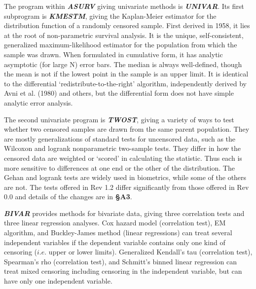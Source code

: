      The program within {\sl\bf ASURV} giving univariate methods is 
{\sl\bf UNIVAR}.  Its first subprogram is {\sl\bf KMESTM}, giving the 
Kaplan-Meier estimator for the distribution function of a randomly 
censored sample.  First derived in 
1958, it lies at the root of non-parametric survival analysis.  It is the
unique, self-consistent, generalized maximum-likelihood estimator for the
population from which the sample was drawn. When formulated in cumulative 
form, it has analytic asymptotic (for large N) error bars. The median is
always well-defined, though the mean is not if the lowest point in the 
sample is an upper limit.  It is identical to the differential 
`redistribute-to-the-right' algorithm, independently derived by Avni et al.
(1980) and others, but the differential form does not have simple analytic 
error analysis.  

     The second univariate program is {\sl\bf TWOST}, giving a variety 
of ways to test whether two censored samples are drawn from the same parent
population.  They are mostly generalizations of standard tests for
uncensored data, such as the Wilcoxon and logrank nonparametric two-sample
tests.  They differ in how the censored data are weighted or `scored' in
calculating the statistic.  Thus each is more sensitive to differences at
one end or the other of the distribution.  The Gehan and logrank tests are
widely used in biometrics, while some of the others are not.  The tests 
offered in Rev 1.2 differ significantly from those offered in Rev 0.0 and
details of the changes are in {\bf \S A3}.

     {\sl\bf BIVAR} provides methods for bivariate data,  giving three 
correlation tests and three linear regression analyses. Cox hazard model 
(correlation test), EM algorithm, and Buckley-James method (linear 
regressions) can treat several independent variables if the dependent 
variable contains only one kind of censoring ($i.e.$ upper or lower limits). 
Generalized Kendall's tau (correlation  test), Spearman's rho 
(correlation test), and Schmitt's binned linear regression can treat 
mixed censoring including censoring in the independent variable, but 
can have only one independent variable.  

